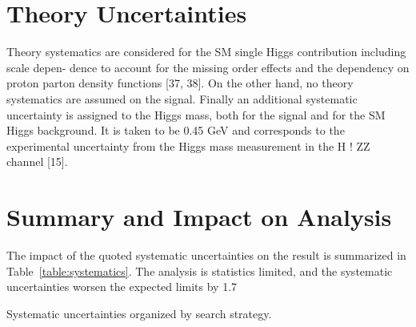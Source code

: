 
\section{Theory Uncertainties\label{sec:theoryunc}}

Theory systematics are considered for the SM single Higgs contribution including scale depen-
dence to account for the missing order effects and the dependency on proton parton density
functions [37, 38]. On the other hand, no theory systematics are assumed on the signal. Finally
an additional systematic uncertainty is assigned to the Higgs mass, both for the signal and for
the SM Higgs background.   It is taken to be 0.45 GeV and corresponds to the experimental
uncertainty from the Higgs mass measurement in the
H
!
ZZ
channel [15].

\section{Summary and Impact on Analysis\label{sec:uncimpact}}

The impact of the quoted systematic uncertainties on the result is summarized in
Table~\ref{table:systematics}.
The analysis is statistics limited, and the systematic uncertainties worsen the expected limits
by 1.7%

\begin{table}[ht]
  \centering
  \renewcommand{\arraystretch}{1.4}
  \caption{Systematic uncertainties organized by search strategy.}
  
  \label{table:systematics}
\end{table}
